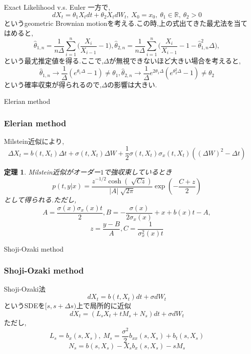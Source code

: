 \documentclass[dvipdfmx,cjk]{beamer}
\numberwithin{equation}{section}
\newtheorem{Thm}     {定理}[section]
\def\R{\mathbb R}
\def\thm{\begin{Thm}}
\def\thmx{\end{Thm}}
\begin{document}
\begin{frame}{Exact Likelihood v.s. Euler}
一方で,
\[
dX_t = \theta_1 X_t dt + \theta_2 X_t dW_t , \ X_0 = x_0 ,\ \theta_1 \in \R,\ \theta_2 >0
\]
というgeometric Brownian motionを考える.この時,上の式出てきた最尤法を当てはめると,\pause
\[
\hat{\theta}_{1,n} = \frac{1}{n\Delta} \sum_{i=1}^n \biggl( \frac{X_i}{X_{i-1}} -1 \biggl),
\hat{\theta}_{2,n} = \frac{1}{n\Delta} \sum_{i=1}^n \biggl( \frac{X_i}{X_{i-1}} -1  - \hat{\theta}_{1,n}^2 \Delta \biggl),
\]
という最尤推定値を得る.ここで,$\Delta$が無視できないほど大きい場合を考えると,\pause
\[
\hat{\theta}_{1,n} \to \frac{1}{\Delta} (e^{\theta_1 \Delta} -1 ) \neq \theta_1,
\hat{\theta}_{2,n} \to \frac{1}{\Delta}e^{2 \theta_1 \Delta}  (e^{\theta_2^2 \Delta} -1 ) \neq \theta_2
\]
という確率収束が得られるので,$\Delta$の影響は大きい.

\end{frame}
\begin{frame}{Elerian method}

\subsubsection{Elerian method}
Milstein近似により,
\[
\Delta X_t = b(t,X_t)\Delta t + \sigma(t,X_t) \Delta W + \frac{1}{2} \sigma(t,X_t)\sigma_x(t,X_t)((\Delta W)^2 - \Delta t)
\]
\thm
Milstein近似がオーダー$1$で強収束しているとき
\[
p(t,y|x) = \frac{z^{-1/2} \cosh (\sqrt[]{Cz}) }{|A|\sqrt[]{2\pi}} \exp(-\frac{C+z}{2})
\]
として得られる.ただし,
\[
A =\frac{\sigma(x)\sigma_x(x) t}{2} , B = -\frac{\sigma(x)}{2\sigma_x(x)}+x+b(x)t-A,
\]
\[
z = \frac{y-B}{A} , C = \frac{1}{\sigma^2_x(x) t}
\]
\thmx

\end{frame}

\begin{frame}{Shoji-Ozaki method}
\subsubsection{Shoji-Ozaki method}
Shoji-Ozaki法
\[
dX_t = b (t,X_t) dt + \sigma dW_t
\]
というSDEを$[s,s+\Delta s)$上で局所的に近似
\[
dX_t = (L_s X_t + tM_s + N_s )dt+ \sigma  dW_t
\]
ただし,
\[
L_s = b_x(s,X_s) , \ M_s = \frac{\sigma^2}{2} b_{xx} (s,X_s) + b_t(s,X_s)
\]
\[
N_s = b(s,X_s) - X_s b_x(s,X_s) - sM_s
\]

\end{frame}
\end{document}

